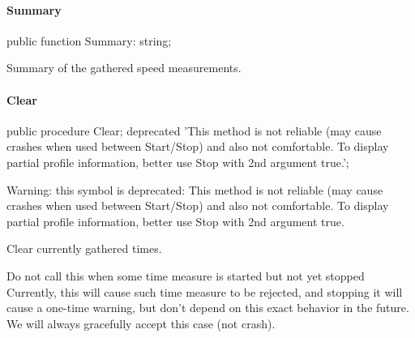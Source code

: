 \documentclass{report}
\begin{document}
\paragraph*{Summary}\hspace*{\fill}

\begin{list}{}{
\setlength{\itemindent}{0cm}
\setlength{\listparindent}{0cm}
\setlength{\leftmargin}{\evensidemargin}
\addtolength{\leftmargin}{\tmplength}
\settowidth{\labelsep}{X}
\addtolength{\leftmargin}{\labelsep}
\setlength{\labelwidth}{\tmplength}
}
\begin{flushleft}
\item[\textbf{Declaration}\hfill]
\begin{ttfamily}
public function Summary: string;\end{ttfamily}


\end{flushleft}
\par
\item[\textbf{Description}]
Summary of the gathered speed measurements.

\end{list}
\paragraph*{Clear}\hspace*{\fill}

\begin{list}{}{
\setlength{\itemindent}{0cm}
\setlength{\listparindent}{0cm}
\setlength{\leftmargin}{\evensidemargin}
\addtolength{\leftmargin}{\tmplength}
\settowidth{\labelsep}{X}
\addtolength{\leftmargin}{\labelsep}
\setlength{\labelwidth}{\tmplength}
}
\begin{flushleft}
\item[\textbf{Declaration}\hfill]
\begin{ttfamily}
public procedure Clear; deprecated 'This method is not reliable (may cause crashes when used between Start/Stop) and also not comfortable. To display partial profile information, better use Stop with 2nd argument true.';\end{ttfamily}


\end{flushleft}
\par
\item[\textbf{Description}]
Warning: this symbol is deprecated: This method is not reliable (may cause crashes when used between Start/Stop) and also not comfortable. To display partial profile information, better use Stop with 2nd argument true.

Clear currently gathered times.

Do not call this when some time measure is started but not yet stopped Currently, this will cause such time measure to be rejected, and stopping it will cause a one{-}time warning, but don't depend on this exact behavior in the future. We will always gracefully accept this case (not crash).

\end{list}
\end{document}
